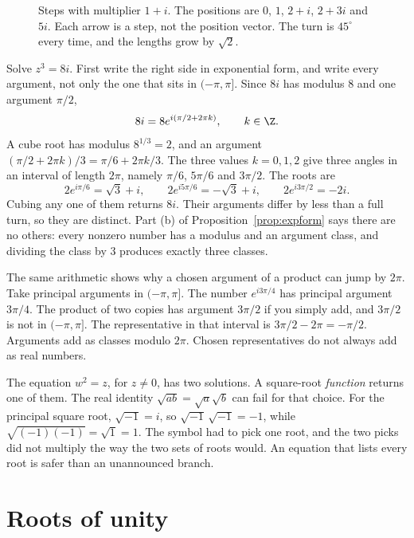 \begin{figure}[ht]
\centering
{}
\caption{Steps with multiplier $1+i$. The positions are $0$, $1$, $2+i$, $2+3i$ and $5i$. Each arrow is a step, not the position vector. The turn is $45^\circ$ every time, and the lengths grow by $\sqrt2$.}
\label{fig:robot}
\end{figure}

\begin{examplex}
Solve $z^3=8i$. First write the right side in exponential form, and write every argument, not only the one that sits in $(-\pi,\pi]$. Since $8i$ has modulus $8$ and one argument $\pi/2$,
\[
8i=8e^{i(\pi/2+2\pi k)},\qquad k\in\Z.
\]
A cube root has modulus $8^{1/3}=2$, and an argument $(\pi/2+2\pi k)/3=\pi/6+2\pi k/3$. The three values $k=0,1,2$ give three angles in an interval of length $2\pi$, namely $\pi/6$, $5\pi/6$ and $3\pi/2$. The roots are
\[
2e^{i\pi/6}=\sqrt3+i,\qquad 2e^{i5\pi/6}=-\sqrt3+i,\qquad 2e^{i3\pi/2}=-2i.
\]
Cubing any one of them returns $8i$. Their arguments differ by less than a full turn, so they are distinct. Part (b) of Proposition~\ref{prop:expform} says there are no others: every nonzero number has a modulus and an argument class, and dividing the class by $3$ produces exactly three classes.

The same arithmetic shows why a chosen argument of a product can jump by $2\pi$. Take principal arguments in $(-\pi,\pi]$. The number $e^{i3\pi/4}$ has principal argument $3\pi/4$. The product of two copies has argument $3\pi/2$ if you simply add, and $3\pi/2$ is not in $(-\pi,\pi]$. The representative in that interval is $3\pi/2-2\pi=-\pi/2$. Arguments add as classes modulo $2\pi$. Chosen representatives do not always add as real numbers.
\end{examplex}

\begin{remark}
The equation $w^2=z$, for $z\ne0$, has two solutions. A square-root \emph{function} returns one of them. The real identity $\sqrt{ab}=\sqrt a\sqrt b$ can fail for that choice. For the principal square root, $\sqrt{-1}=i$, so $\sqrt{-1}\,\sqrt{-1}=-1$, while $\sqrt{(-1)(-1)}=\sqrt1=1$. The symbol had to pick one root, and the two picks did not multiply the way the two sets of roots would. An equation that lists every root is safer than an unannounced branch.
\end{remark}

\section{Roots of unity}

